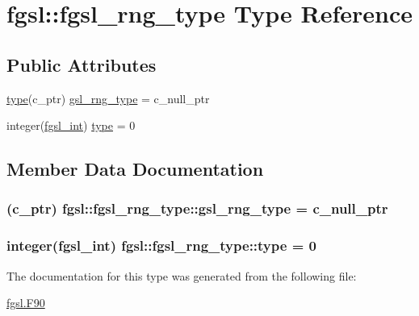 \hypertarget{structfgsl_1_1fgsl__rng__type}{}\section{fgsl\+:\+:fgsl\+\_\+rng\+\_\+type Type Reference}
\label{structfgsl_1_1fgsl__rng__type}
\subsection*{Public Attributes}
\begin{DoxyCompactItemize}
\item 
\hyperlink{structfgsl_1_1fgsl__rng__type_a124544a893fbccaf500ab420de1dfa6b}{type}(c\+\_\+ptr) \hyperlink{structfgsl_1_1fgsl__rng__type_a0511dd9837684ef4e599160873f28d7d}{gsl\+\_\+rng\+\_\+type} = c\+\_\+null\+\_\+ptr
\item 
integer(\hyperlink{namespacefgsl_a222deda1d7a0c0e845ce4a683318efeb}{fgsl\+\_\+int}) \hyperlink{structfgsl_1_1fgsl__rng__type_a124544a893fbccaf500ab420de1dfa6b}{type} = 0
\end{DoxyCompactItemize}


\subsection{Member Data Documentation}
\hypertarget{structfgsl_1_1fgsl__rng__type_a0511dd9837684ef4e599160873f28d7d}{}
\subsubsection[{gsl\+\_\+rng\+\_\+type}]{(c\+\_\+ptr) fgsl\+::fgsl\+\_\+rng\+\_\+type\+::gsl\+\_\+rng\+\_\+type = c\+\_\+null\+\_\+ptr}\label{structfgsl_1_1fgsl__rng__type_a0511dd9837684ef4e599160873f28d7d}
\hypertarget{structfgsl_1_1fgsl__rng__type_a124544a893fbccaf500ab420de1dfa6b}{}
\subsubsection[{type}]{\setlength{\rightskip}{0pt plus 5cm}integer({\bf fgsl\+\_\+int}) fgsl\+::fgsl\+\_\+rng\+\_\+type\+::type = 0}\label{structfgsl_1_1fgsl__rng__type_a124544a893fbccaf500ab420de1dfa6b}


The documentation for this type was generated from the following file\+:\begin{DoxyCompactItemize}
\item 
\hyperlink{fgsl_8F90}{fgsl.\+F90}\end{DoxyCompactItemize}
